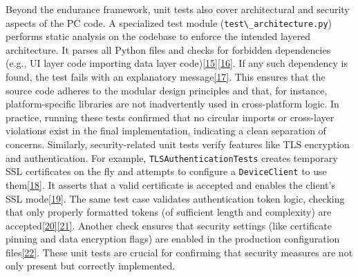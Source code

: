 \documentclass[12pt,a4paper]{article}
\begin{document}
Beyond the endurance framework, unit tests also cover architectural and security aspects of the PC code. A specialized test module (\passthrough{\lstinline!test\_architecture.py!}) performs static analysis on the codebase to enforce the intended layered architecture. It parses all Python files and checks for forbidden dependencies (e.g., UI layer code importing data layer code)\href{https://github.com/buccancs/bucika_gsr/blob/7048f7f6a7536f5cd577ed2184800d3dad97fd08/tests/test_architecture.py\#L140-L149}{{[}15{]}}\href{https://github.com/buccancs/bucika_gsr/blob/7048f7f6a7536f5cd577ed2184800d3dad97fd08/tests/test_architecture.py\#L170-L178}{{[}16{]}}. If any such dependency is found, the test fails with an explanatory message\href{https://github.com/buccancs/bucika_gsr/blob/7048f7f6a7536f5cd577ed2184800d3dad97fd08/tests/test_architecture.py\#L2-L10}{{[}17{]}}. This ensures that the source code adheres to the modular design principles and that, for instance, platform-specific libraries are not inadvertently used in cross-platform logic. In practice, running these tests confirmed that no circular imports or cross-layer violations exist in the final implementation, indicating a clean separation of concerns. Similarly, security-related unit tests verify features like TLS encryption and authentication. For example, \passthrough{\lstinline!TLSAuthenticationTests!} creates temporary SSL certificates on the fly and attempts to configure a \passthrough{\lstinline!DeviceClient!} to use them\href{https://github.com/buccancs/bucika_gsr/blob/7048f7f6a7536f5cd577ed2184800d3dad97fd08/tests/security/test_tls_authentication.py\#L145-L153}{{[}18{]}}. It asserts that a valid certificate is accepted and enables the client's SSL mode\href{https://github.com/buccancs/bucika_gsr/blob/7048f7f6a7536f5cd577ed2184800d3dad97fd08/tests/security/test_tls_authentication.py\#L151-L159}{{[}19{]}}. The same test case validates authentication token logic, checking that only properly formatted tokens (of sufficient length and complexity) are accepted\href{https://github.com/buccancs/bucika_gsr/blob/7048f7f6a7536f5cd577ed2184800d3dad97fd08/tests/security/test_tls_authentication.py\#L157-L165}{{[}20{]}}\href{https://github.com/buccancs/bucika_gsr/blob/7048f7f6a7536f5cd577ed2184800d3dad97fd08/tests/security/test_tls_authentication.py\#L176-L184}{{[}21{]}}. Another check ensures that security settings (like certificate pinning and data encryption flags) are enabled in the production configuration files\href{https://github.com/buccancs/bucika_gsr/blob/7048f7f6a7536f5cd577ed2184800d3dad97fd08/tests/security/test_tls_authentication.py\#L194-L203}{{[}22{]}}. These unit tests are crucial for confirming that security measures are not only present but correctly implemented.
\end{document}
